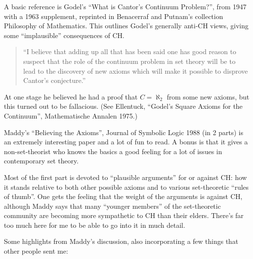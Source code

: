 A basic reference is Godel's ``What is Cantor's Continuum Problem?'',
from 1947 with a 1963 supplement, reprinted in Benacerraf and Putnam's
collection Philosophy of Mathematics.  This outlines Godel's generally
anti-CH views, giving some ``implausible'' consequences of CH.

\begin{quote}
  ``I believe that adding up all that has been said one has good reason
  to suspect that the role of the continuum problem in set theory will
  be to lead to the discovery of new axioms which will make it possible
  to disprove Cantor's conjecture.''
\end{quote}

At one stage he believed he had a proof that $C = \aleph_2$ from some
new axioms, but this turned out to be fallacious.  (See Ellentuck,
``Godel's Square Axioms for the Continuum'', Mathematische Annalen
1975.)

Maddy's ``Believing the Axioms'', Journal of Symbolic Logic 1988 (in 2
parts) is an extremely interesting paper and a lot of fun to read.  A
bonus is that it gives a non-set-theorist who knows the basics a good
feeling for a lot of issues in contemporary set theory.

Most of the first part is devoted to ``plausible arguments'' for or
against CH: how it stands relative to both other possible axioms and to
various set-theoretic ``rules of thumb''.  One gets the feeling that the
weight of the arguments is against CH, although Maddy says that many
``younger members'' of the set-theoretic community are becoming more
sympathetic to CH than their elders.  There's far too much here for me
to be able to go into it in much detail.

Some highlights from Maddy's discussion, also incorporating a few things
that other people sent me:

